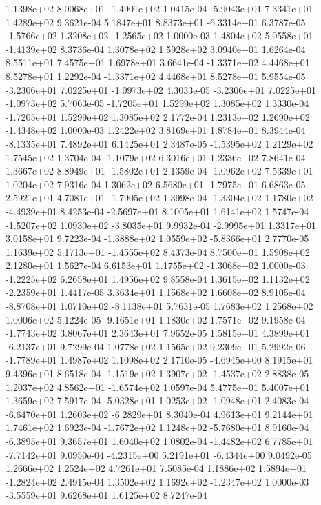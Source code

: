  1.1398e+02  8.0068e+01 -1.4901e+02  1.0415e-04
-5.9043e+01  7.3341e+01  1.4289e+02  9.3621e-04
 5.1847e+01  8.8373e+01 -6.3314e+01  6.3787e-05
-1.5766e+02  1.3208e+02 -1.2565e+02  1.0000e-03
 1.4804e+02  5.0558e+01 -1.4139e+02  8.3736e-04
1.3078e+02 1.5928e+02 3.0940e+01  1.6264e-04
8.5511e+01 7.4575e+01 1.6978e+01  3.6641e-04
-1.3371e+02  4.4468e+01  8.5278e+01  1.2292e-04
-1.3371e+02  4.4468e+01  8.5278e+01  5.9554e-05
-3.2306e+01  7.0225e+01 -1.0973e+02  4.3033e-05
-3.2306e+01  7.0225e+01 -1.0973e+02  5.7063e-05
-1.7205e+01  1.5299e+02  1.3085e+02  1.3330e-04
-1.7205e+01  1.5299e+02  1.3085e+02  2.1772e-04
 1.2313e+02  1.2690e+02 -1.4348e+02  1.0000e-03
1.2422e+02 3.8169e+01 1.8784e+01  8.3944e-04
-8.1335e+01  7.4892e+01  6.1425e+01  2.3487e-05
-1.5395e+02  1.2129e+02  1.7545e+02  1.3704e-04
-1.1079e+02  6.3016e+01  1.2336e+02  7.8641e-04
 1.3667e+02  8.8949e+01 -1.5802e+01  2.1359e-04
-1.0962e+02  7.5339e+01  1.0204e+02  7.9316e-04
 1.3062e+02  6.5680e+01 -1.7975e+01  6.6863e-05
 2.5921e+01  4.7081e+01 -1.7905e+02  1.3998e-04
-1.3304e+02  1.1780e+02 -4.4939e+01  8.4253e-04
-2.5697e+01  8.1005e+01  1.6141e+02  1.5747e-04
-1.5207e+02  1.0930e+02 -3.8035e+01  9.9932e-04
-2.9995e+01  1.3317e+01  3.0158e+01  9.7223e-04
-1.3888e+02  1.0559e+02 -5.8366e+01  2.7770e-05
 1.1639e+02  5.1713e+01 -1.4555e+02  8.4373e-04
8.7500e+01 1.5908e+02 2.1280e+01  1.5627e-04
 6.6153e+01  1.1755e+02 -1.3068e+02  1.0000e-03
-1.2225e+02  6.2658e+01  1.4956e+02  9.8558e-04
 1.3615e+02  1.1132e+02 -2.2359e+01  1.4417e-05
3.3634e+01 1.1568e+02 1.6608e+02  8.9105e-04
-8.8708e+01  1.0710e+02 -8.1138e+01  5.7631e-05
1.7683e+02 1.2568e+02 1.0006e+02  5.1224e-05
-9.1651e+01  1.1830e+02  1.7571e+02  9.1958e-04
-1.7743e+02  3.8067e+01  2.3643e+01  7.9652e-05
 1.5815e+01  4.3899e+01 -6.2137e+01  9.7299e-04
1.0778e+02 1.1565e+02 9.2309e+01  5.2992e-06
-1.7789e+01  1.4987e+02  1.1098e+02  2.1710e-05
-4.6945e+00  8.1915e+01  9.4396e+01  8.6518e-04
-1.1519e+02  1.3907e+02 -1.4537e+02  2.8838e-05
 1.2037e+02  4.8562e+01 -1.6574e+02  1.0597e-04
5.4775e+01 5.4007e+01 1.3659e+02  7.5917e-04
-5.0328e+01  1.0253e+02 -1.0948e+01  2.4083e-04
-6.6470e+01  1.2603e+02 -6.2829e+01  8.3040e-04
4.9613e+01 9.2144e+01 1.7461e+02  1.6923e-04
-1.7672e+02  1.1248e+02 -5.7680e+01  8.9160e-04
-6.3895e+01  9.3657e+01  1.6040e+02  1.0802e-04
-1.4482e+02  6.7785e+01 -7.7142e+01  9.0950e-04
-4.2315e+00  5.2191e+01 -6.4344e+00  9.0492e-05
1.2666e+02 1.2524e+02 4.7261e+01  7.5085e-04
 1.1886e+02  1.5894e+01 -1.2824e+02  2.4915e-04
 1.3502e+02  1.1692e+02 -1.2347e+02  1.0000e-03
-3.5559e+01  9.6268e+01  1.6125e+02  8.7247e-04
